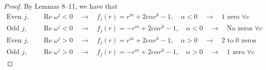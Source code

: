 \documentclass{amsart}
\renewcommand{\Re}{\operatorname{Re}}
\theoremstyle{definition}
\theoremstyle{remark}
\begin{document}
\begin{proof}

By Lemmas 8--11, 
we have that
\begin{align*}
\text{Even } j, &\quad \Re\omega^j < 0 \hspace{1em} \rightarrow \hspace{1em} f_j(r) = r^m + 2c\alpha r^k - 1, \quad \alpha < 0 \hspace{1em} \rightarrow \hspace{1em} 1 \text{ zero } \forall c \\[1em]
\text{Odd } j, &\quad \Re\omega^j < 0 \hspace{1em} \rightarrow \hspace{1em} f_j(r) = -r^m + 2c\alpha r^k - 1, \quad \alpha < 0 \hspace{1em} \rightarrow \hspace{1em} \text{No zeros } \forall c \\[1em]
\text{Even } j, &\quad \Re\omega^j > 0 \hspace{1em} \rightarrow \hspace{1em} f_j(r) = r^m + 2c\alpha r^k - 1, \quad \alpha > 0 \hspace{1em} \rightarrow \hspace{1em} 2 \text{ to } 0  \text{ zeros }\\[1em]
\text{Odd } j, &\quad \Re\omega^j > 0 \hspace{1em} \rightarrow \hspace{1em} f_j(r) = -r^m + 2c\alpha r^k - 1, \quad \alpha > 0 \hspace{1em} \rightarrow \hspace{1em} 1 \text{ zero } \forall c%
\end{align*}


\end{proof}
\end{document}

